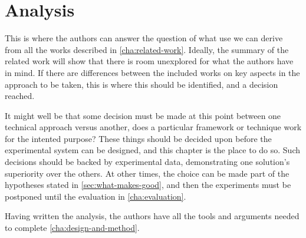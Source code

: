 \chapter{Analysis}
\label{cha:analysis}

This is where the authors can answer the question of what use we can
derive from all the works described in
\autoref{cha:related-work}. Ideally, the summary of the related work
will show that there is room unexplored for what the authors have in
mind. If there are differences between the included works on key
aspects in the approach to be taken, this is where this should be
identified, and a decision reached.

It might well be that some decision must be made at this point between
one technical approach versus another, \eg does a particular framework
or technique work for the intented purpose?  These things should be
decided upon before the experimental system can be designed, and this
chapter is the place to do so. Such decisions should be backed by
experimental data, demonstrating one solution's superiority over the
others. At other times, the choice can be made part of the hypotheses
stated in \autoref{sec:what-makes-good}, and then the experiments must
be postponed until the evaluation in \autoref{cha:evaluation}.

Having written the analysis, the authors have all the tools and
arguments needed to complete \autoref{cha:design-and-method}.



